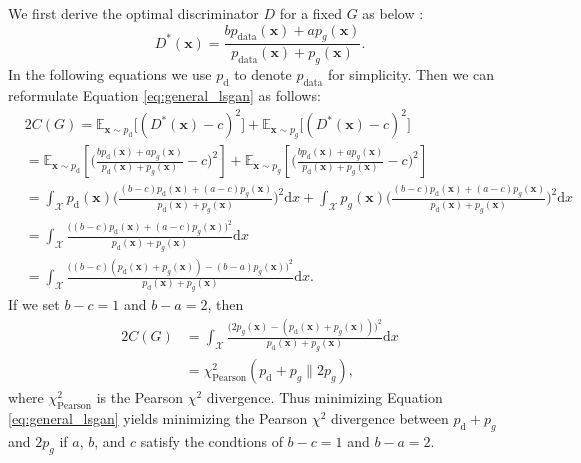 \documentclass{article} %
\begin{document}
We first derive the optimal discriminator $D$ for a fixed $G$ as below :
\begin{equation}
\label{eq:optimal_d}
D^*(\bm{x}) = \frac{bp_\text{data}(\bm{x})+ap_g(\bm{x})}{p_\text{data}(\bm{x})+p_g(\bm{x})}.
\end{equation}
In the following equations we use $p_\text{d}$ to denote $p_\text{data}$ for simplicity. Then we can reformulate Equation \ref{eq:general_lsgan} as follows:
\small
\begin{equation}
\label{eq:lsgan_divergence}
\begin{split}
&2C(G) = \mathbb{E}_{\bm{x} \sim p_{\text{d}}}\bigl[(D^*(\bm{x})-c)^2\bigr]+\mathbb{E}_{\bm{x} \sim p_{g}}\bigl[(D^*(\bm{x})-c)^2\bigr] \\
&=\mathbb{E}_{\bm{x} \sim p_{\text{d}}}
\left[
\bigl(\frac{bp_\text{d}(\bm{x})+ap_g(\bm{x})}{p_\text{d}(\bm{x})+p_g(\bm{x})}-c\bigr)^2
\right] +\mathbb{E}_{\bm{x} \sim p_{g}}
\left[
\bigl(\frac{bp_\text{d}(\bm{x})+ap_g(\bm{x})}{p_\text{d}(\bm{x})+p_g(\bm{x})}-c\bigr)^2
\right] \\
&=\int_{\mathcal{X}}p_\text{d}(\bm{x}) \bigl(\frac{(b-c)p_\text{d}(\bm{x})+(a-c)p_g(\bm{x})}{p_\text{d}(\bm{x})+p_g(\bm{x})}\bigr)^2 \textrm{d}x + \int_{\mathcal{X}}p_g(\bm{x}) \bigl(\frac{(b-c)p_\text{d}(\bm{x})+(a-c)p_g(\bm{x})}{p_\text{d}(\bm{x})+p_g(\bm{x})}\bigr)^2 \textrm{d}x \\
&=\int_{\mathcal{X}} \frac{\bigl((b-c)p_\text{d}(\bm{x})+(a-c)p_g(\bm{x})\bigr)^2}{p_\text{d}(\bm{x})+p_g(\bm{x})} \textrm{d}x \\
&=\int_{\mathcal{X}} \frac{\bigl((b-c)(p_\text{d}(\bm{x})+p_g(\bm{x}))-(b-a)p_g(\bm{x})\bigr)^2}{p_\text{d}(\bm{x})+p_g(\bm{x})} \textrm{d}x.
\end{split}
\end{equation}
\normalsize 
If we set $b-c=1$ and $b-a=2$, then
\begin{equation}
\label{eq:lsgan_divergence}
\begin{split}
2C(G)&=\int_{\mathcal{X}} \frac{\bigl(2p_g(\bm{x})-(p_\text{d}(\bm{x})+p_g(\bm{x}))\bigr)^2}{p_\text{d}(\bm{x})+p_g(\bm{x})} \textrm{d}x \\
&=\chi^2_\text{Pearson}(p_\text{d}+p_g\|2p_g),
\end{split}
\end{equation}
where $\chi^2_\text{Pearson}$ is the Pearson $\chi^2$ divergence. Thus minimizing Equation \ref{eq:general_lsgan} yields minimizing the Pearson $\chi^2$ divergence between $p_\text{d}+p_g$ and $2p_g$ if $a$, $b$, and $c$ satisfy the condtions of $b-c=1$ and $b-a=2$. 
\end{document}
